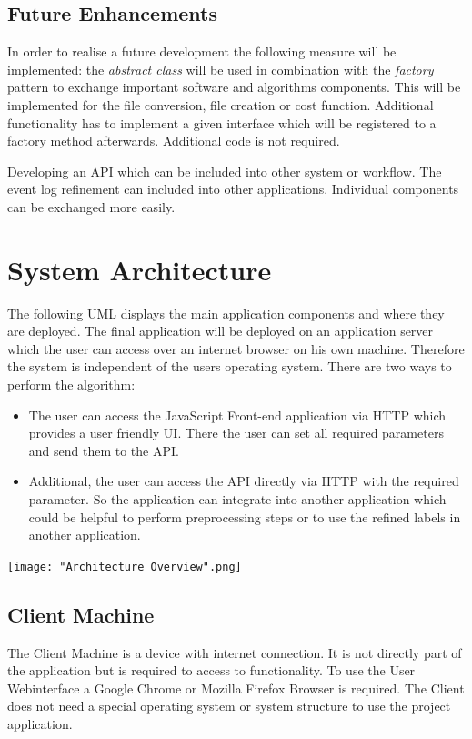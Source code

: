 \documentclass[notitlepage]{article}
\begin{document}
\begin{flushleft}
\subsection{Future Enhancements}
In order to realise a future development the following measure will be implemented: the \textit{abstract class} will be used in combination with the \textit{factory} pattern to exchange important software and algorithms components. 
This will be implemented for the file conversion, file creation or cost function. Additional functionality has to implement a given interface which will be registered to a factory method afterwards. Additional code is not required. 

Developing an API which can be included into other system or workflow. The event log refinement can included into other applications. 
Individual components can be exchanged more easily.

\section{System Architecture}
The following UML displays the main application components and where they are deployed. The final application will be deployed on an application server which the user can access over an internet browser on his own machine. Therefore the system is independent of the users operating system. There are two ways to perform the 
algorithm:

\begin{itemize}
	\item The user can access the JavaScript Front-end application via HTTP which provides a user friendly UI. There the user can set all required parameters and send them to the API.
	\item Additional, the user can access the API directly via HTTP with the required parameter. So the application can integrate into another application which could be helpful to perform preprocessing steps or to use the refined labels in another application.
\end{itemize}




\texttt{[image: "Architecture Overview".png]}

\subsection{Client Machine}
The Client Machine is a device with internet connection. It is not directly part of the application but is required to access to functionality.
To use the User Webinterface a Google Chrome or Mozilla Firefox Browser is required. The Client does not need a special operating system or system structure to use the project application.


\end{flushleft}
\end{document}
